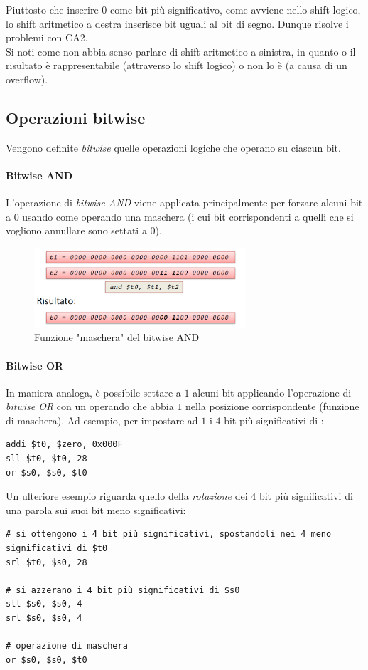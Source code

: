 \documentclass[class=book, crop=false, oneside]{standalone}
\begin{document}
Piuttosto che inserire 0 come bit più significativo, come avviene nello shift logico, lo shift aritmetico a destra inserisce bit uguali al bit di segno. Dunque risolve i problemi con CA2.\\
Si noti come non abbia senso parlare di shift aritmetico a sinistra, in quanto o il risultato è rappresentabile (attraverso lo shift logico) o non lo è (a causa di un overflow).

\subsection{Operazioni bitwise}
Vengono definite \emph{bitwise} quelle operazioni logiche che operano su ciascun bit.

\paragraph{Bitwise AND}
L'operazione di \emph{bitwise AND} viene applicata principalmente per forzare alcuni bit a 0 usando come operando una maschera (i cui bit corrispondenti a quelli che si vogliono annullare sono settati a 0).
\begin{figure}[H]
	\centering
	\includegraphics[width=0.7\textwidth,keepaspectratio]{bitwise_and}
	\caption{Funzione "maschera" del bitwise AND}
\end{figure}

\paragraph{Bitwise OR}
In maniera analoga, è possibile settare a \(1\) alcuni bit applicando l'operazione di \emph{bitwise OR} con un operando che abbia \(1\) nella posizione corrispondente (funzione di maschera). Ad esempio, per impostare ad \(1\) i \(4\) bit più significativi di :
\begin{verbatim}
addi $t0, $zero, 0x000F
sll $t0, $t0, 28
or $s0, $s0, $t0
\end{verbatim}

Un ulteriore esempio riguarda quello della \emph{rotazione} dei \(4\) bit più significativi di una parola sui suoi bit meno significativi:
\begin{verbatim}
# si ottengono i 4 bit più significativi, spostandoli nei 4 meno significativi di $t0
srl $t0, $s0, 28

# si azzerano i 4 bit più significativi di $s0
sll $s0, $s0, 4
srl $s0, $s0, 4

# operazione di maschera
or $s0, $s0, $t0
\end{verbatim}
\end{document}
